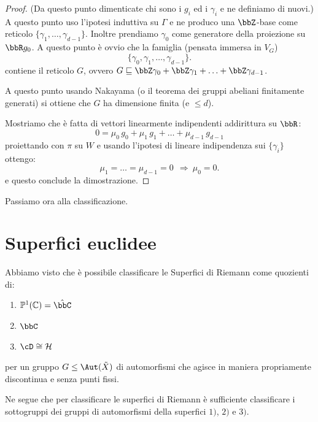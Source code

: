 \begin{proof}
    (Da questo punto dimenticate chi sono i $g_i$ ed i $\gamma_i$ e ne definiamo di nuovi.)
    A questo punto uso l'ipotesi induttiva su $\Gamma$ e ne produco una $\bbZ$-base come reticolo $\{\gamma_1, \ldots, \gamma_{d-1}\}$.
    Inoltre prendiamo $\gamma_0$ come generatore della proiezione su $\bbR g_0$.
    A questo punto è ovvio che la famiglia (pensata immersa in $V_G$)
    $$
    \{\gamma_0,\gamma_1,\ldots,\gamma_{d-1}\}.
    $$
    contiene il reticolo $G$, ovvero $G \sqsubseteq \bbZ \gamma_0 + \bbZ \gamma_1 + \ldots + \bbZ \gamma_{d-1}$.

    A questo punto usando Nakayama (o il teorema dei gruppi abeliani finitamente generati) si ottiene che $G$ ha dimensione finita (e $\le d$).

    Mostriamo che è fatta di vettori linearmente indipendenti addirittura su $\bbR$:
    $$
    0=\mu_0\, g_0+\mu_1\, g_1+\ldots+\mu_{d-1}\, g_{d-1}
    $$
    proiettando con $\pi$ su $W$ e usando l'ipotesi di lineare indipendenza sui $\{\gamma_i\}$ ottengo:
    $$
    \mu_1=\ldots=\mu_{d-1}=0\ \ \Rightarrow\  \mu_0=0.
    $$
    e questo conclude la dimostrazione.
\end{proof}

Passiamo ora alla classificazione.



\section{Superfici euclidee}
Abbiamo visto che è possibile classificare le Superfici di Riemann come quozienti di:
\begin{enumerate}
\item $\mathbb{P}^1(\mathbb{C})=\hat{\bbC}$
\item $\bbC$
\item $\cD \cong \mathcal{H}$
\end{enumerate}
per un gruppo $G\le\Aut(\tilde{X})$ di automorfismi che agisce in maniera propriamente discontinua e senza punti fissi.

Ne segue che per classificare le superfici di Riemann è sufficiente classificare i sottogruppi dei gruppi di automorfismi della superfici $1)$, $2)$ e $3)$.


